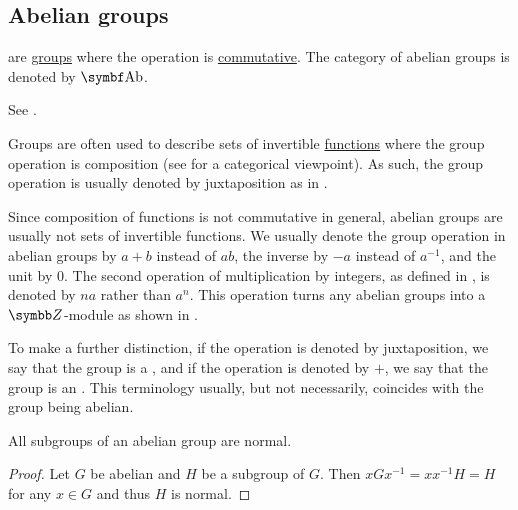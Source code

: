 \subsection{Abelian groups}\label{subsec:abelian_groups}

\begin{definition}\label{def:abelian_group}
   are \hyperref[def:magma/monoid]{groups} where the operation is \hyperref[def:algebraic_theory/commutativity]{commutative}. The category of abelian groups is denoted by \( \Cat{Ab} \).

  See .
\end{definition}

\begin{remark}\label{remark:additive_group}
  Groups are often used to describe sets of invertible \hyperref[def:function_invertibility]{functions} where the group operation is composition (see  for a categorical viewpoint). As such, the group operation is usually denoted by juxtaposition as in .

  Since composition of functions is not commutative in general, abelian groups are usually not sets of invertible functions. We usually denote the group operation in abelian groups by \( a + b \) instead of \( ab \), the inverse by \( -a \) instead of \( a^{-1} \), and the unit by \( 0 \). The second operation of multiplication by integers, as defined in , is denoted by \( na \) rather than \( a^n \). This operation turns any abelian groups into a \( \BZ \)-module as shown in .

  To make a further distinction, if the operation is denoted by juxtaposition, we say that the group is a , and if the operation is denoted by \( + \), we say that the group is an . This terminology usually, but not necessarily, coincides with the group being abelian.
\end{remark}

\begin{proposition}\label{thm:abelian_normal_subgroups}
  All subgroups of an abelian group are normal.
\end{proposition}
\begin{proof}
  Let \( G \) be abelian and \( H \) be a subgroup of \( G \). Then \( xGx^{-1} = xx^{-1}H = H \) for any \( x \in G \) and thus \( H \) is normal.
\end{proof}

